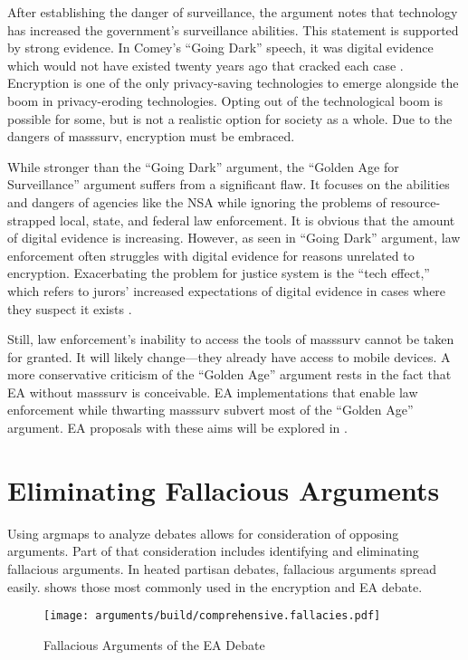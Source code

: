 After establishing the danger of surveillance, the argument notes that technology has increased the government's
surveillance abilities. This statement is supported by strong evidence. In Comey's ``Going Dark'' speech, it was digital
evidence which would not have existed twenty years ago that cracked each case \cite{comey_2014}. Encryption is one of
the only privacy-saving technologies to emerge alongside the boom in privacy-eroding technologies. Opting out of the
technological boom is possible for some, but is not a realistic option for society as a whole. Due to the dangers of
\ac{masssurv}, \ac{encryption} must be embraced.

While stronger than the ``Going Dark'' argument, the ``Golden Age for Surveillance'' argument suffers from a significant
flaw. It focuses on the abilities and dangers of agencies like the \ac{NSA} while ignoring the problems of
resource-strapped local, state, and federal law enforcement. It is obvious that the amount of digital evidence is
increasing. However, as seen in ``Going Dark'' argument, law enforcement often struggles with digital evidence for
reasons unrelated to encryption. Exacerbating the problem for justice system is the ``tech effect,'' which refers to
jurors' increased expectations of digital evidence in cases where they suspect it exists \cite{shelton_study_2006}.

Still, law enforcement's inability to access the tools of \ac{masssurv} cannot be taken for granted. It will likely
change---they already have access to mobile devices. A more conservative criticism of the ``Golden Age'' argument rests
in the fact that \ac{EA} without \ac{masssurv} is conceivable. \ac{EA} implementations that enable law enforcement while
thwarting \ac{masssurv} subvert most of the ``Golden Age'' argument. \ac{EA} proposals with these aims will be explored
in .


\section{Eliminating Fallacious Arguments}

Using \acp{argmap} to analyze debates allows for consideration of opposing arguments. Part of that consideration
includes identifying and eliminating fallacious arguments. In heated partisan debates, fallacious arguments spread
easily.  shows those most commonly used in the encryption and \ac{EA} debate.

\begin{figure}[t!]
  \centering\CaptionFontSize
  \texttt{[image: arguments/build/comprehensive.fallacies.pdf]}
  \caption{Fallacious Arguments of the EA Debate}
  \label{fig-arg-fallacies}
\end{figure}

